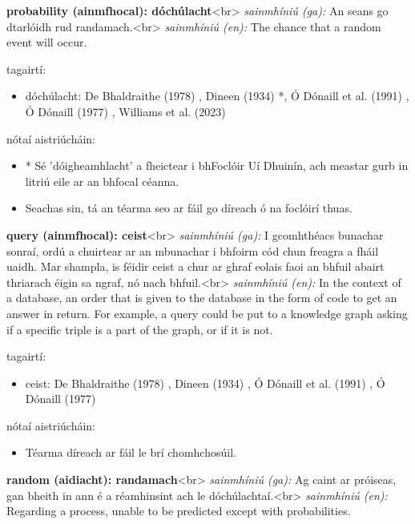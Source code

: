 \documentclass{article}
\begin{document}
\textbf{probability (ainmfhocal): dóchúlacht}<br>
\textit{sainmhíniú (ga):} An seans go dtarlóidh rud randamach.<br>
\textit{sainmhíniú (en):} The chance that a random event will occur.

tagairtí:
\begin{itemize}
	\item dóchúlacht: De Bhaldraithe (1978) \cite{de-bhaldraithe}, Dineen (1934) \cite{dineen}*, Ó Dónaill et al. (1991) \cite{focloir-beag}, Ó Dónaill (1977) \cite{odonaill}, Williams et al. (2023) \cite{storchiste}
\end{itemize}

nótaí aistriúcháin:
\begin{itemize}
	\item * Sé 'dóigheamhlacht' a fheictear i bhFoclóir Uí Dhuinín, ach meastar gurb in litriú eile ar an bhfocal céanna.
	\item Seachas sin, tá an téarma seo ar fáil go díreach ó na foclóirí thuas.
\end{itemize}


\textbf{query (ainmfhocal): ceist}<br>
\textit{sainmhíniú (ga):} I gcomhthéacs bunachar sonraí, ordú a chuirtear ar an mbunachar i bhfoirm cód chun freagra a fháil uaidh. Mar shampla, is féidir ceist a chur ar ghraf eolais faoi an bhfuil abairt thriarach éigin sa ngraf, nó nach bhfuil.<br>
\textit{sainmhíniú (en):} In the context of a database, an order that is given to the database in the form of code to get an answer in return. For example, a query could be put to a knowledge graph asking if a specific triple is a part of the graph, or if it is not.

tagairtí:
\begin{itemize}
	\item ceist: De Bhaldraithe (1978) \cite{de-bhaldraithe}, Dineen (1934) \cite{dineen}, Ó Dónaill et al. (1991) \cite{focloir-beag}, Ó Dónaill (1977) \cite{odonaill}
\end{itemize}

nótaí aistriúcháin:
\begin{itemize}
	\item Téarma díreach ar fáil le brí chomhchosúil.
\end{itemize}


\textbf{random (aidiacht): randamach}<br>
\textit{sainmhíniú (ga):} Ag caint ar próiseas, gan bheith in ann é a réamhinsint ach le dóchúlachtaí.<br>
\textit{sainmhíniú (en):} Regarding a process, unable to be predicted except with probabilities.
\end{document}
